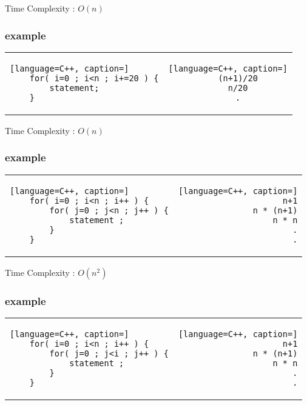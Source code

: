 \documentclass[12pt]{article}
\begin{document}
Time Complexity : $O(n)$



\subsubsection{example}


\begin{center}
  \bgroup
  \def\arraystretch{1.5}%
  \begin{tabular}{ H  C  }
	\begin{lstlisting}[language=C++, caption=]
	for( i=0 ; i<n ; i+=20 ) {
		statement;
	}
	\end{lstlisting}
     &  
	\begin{lstlisting}[language=C++, caption=]
	(n+1)/20
	n/20
	.
	\end{lstlisting}
  \end{tabular}
  \egroup
\end{center}




Time Complexity : $O(n)$



\subsubsection{example}



\begin{center}
  \bgroup
  \def\arraystretch{1.5}%
  \begin{tabular}{ E  D  }
	\begin{lstlisting}[language=C++, caption=]
	for( i=0 ; i<n ; i++ ) {
		for( j=0 ; j<n ; j++ ) {
			statement ;
		}
	}
	\end{lstlisting}
     &  
	\begin{lstlisting}[language=C++, caption=]
	n+1
	n * (n+1)
	n * n
	.
	.
	\end{lstlisting}
  \end{tabular}
  \egroup
\end{center}


Time Complexity : $O(n^{2})$






\subsubsection{example}



\begin{center}
  \bgroup
  \def\arraystretch{1.5}%
  \begin{tabular}{ E  D  }
	\begin{lstlisting}[language=C++, caption=]
	for( i=0 ; i<n ; i++ ) {
		for( j=0 ; j<i ; j++ ) {
			statement ;
		}
	}
	\end{lstlisting}
     &  
	\begin{lstlisting}[language=C++, caption=]
	n+1
	n * (n+1)
	n * n
	.
	.
	\end{lstlisting}
  \end{tabular}
  \egroup
\end{center}
\end{document}
